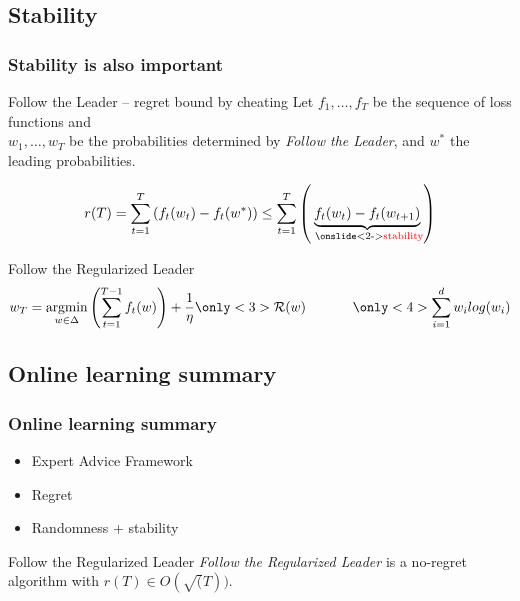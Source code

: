\documentclass{beamer}
\newcommand{\mR}{\ensuremath{\mathcal{R}}}
\DeclareMathOperator*{\argmin}{argmin}
\newcommand{\inserteqstrut}[1]{%
	\rlap{$\displaystyle#1$}%
	\phantom{\biggesteq}}
\newcommand{\biggesteq}{%
	\vphantom{\sum_{i=1}^{d} w_i log(w_i)}%
	\hphantom{\sum_{i=1}^{d} w_i log(w_i)}%
}
\begin{document}
\subsection{Stability}
\begin{frame}
	\frametitle{Stability is also important}
		\begin{block}{Follow the Leader -- regret bound by cheating}
			Let $f_1 ,\ldots, f_T$ be the sequence of loss functions and \\
			$w_1 ,\ldots, w_T$ be the probabilities determined by \textit{Follow the Leader},
			and $w^*$ the leading probabilities.
			
			\begin{equation*}
				r(T) =  \sum_{t=1}^{T}  \left( f_t(w_t) - f_t(w^*) \right)
				\leq
				\sum_{t=1}^{T} \left( \underbrace{f_t(w_t) - f_t(w_{t+1})}_\text{ \onslide<2->{\textcolor{red}{stability}}} \right)
			\end{equation*}
		\end{block}

\pause[3]
	\begin{block}{Follow the Regularized Leader \only<4>{\textcolor{red}{with entropic regularizer}}}
	\begin{equation*}
	w_T
	= \argmin_{w \in \Delta}  \left(\sum_{t=1}^{T-1} f_t(w) \right) + \frac{1}{\eta}  \only<3>{\inserteqstrut{\mR(w)}} \only<4>{\inserteqstrut{\sum_{i=1}^{d} w_i log(w_i)}}
	\end{equation*}
	\end{block}

\end{frame}


\subsection{Online learning summary}
\begin{frame}
	\frametitle{Online learning summary}
	\begin{itemize}
		\item Expert Advice Framework \pause
		\item Regret \pause
		\item Randomness + stability \pause
	\end{itemize}
	
	\begin{block}{Follow the Regularized Leader}
		\textit{Follow the Regularized Leader} is a no-regret algorithm with $r(T)\in O(\sqrt(T))$.
	\end{block}
\end{frame}
\end{document}
